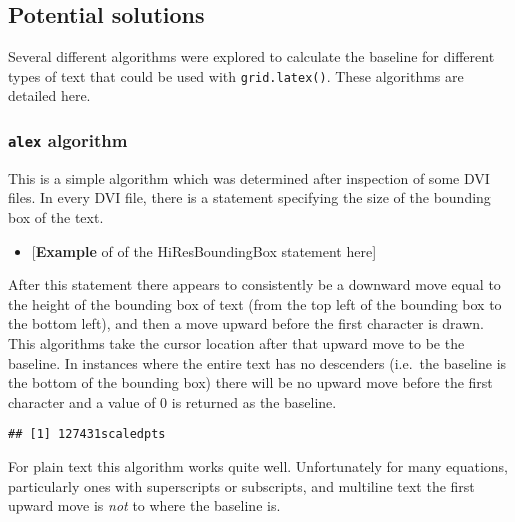 \documentclass[]{article}
\newenvironment{Shaded}{\begin{snugshade}}{\end{snugshade}}
\newcommand{\KeywordTok}[1]{\textcolor[rgb]{0.13,0.29,0.53}{\textbf{#1}}}
\newcommand{\DataTypeTok}[1]{\textcolor[rgb]{0.13,0.29,0.53}{#1}}
\newcommand{\CharTok}[1]{\textcolor[rgb]{0.31,0.60,0.02}{#1}}
\newcommand{\StringTok}[1]{\textcolor[rgb]{0.31,0.60,0.02}{#1}}
\newcommand{\NormalTok}[1]{#1}
\providecommand{\tightlist}{%
  \setlength{\itemsep}{0pt}\setlength{\parskip}{0pt}}
\begin{document}
\subsection{Potential solutions}\label{potential-solutions}

Several different algorithms were explored to calculate the baseline for
different types of text that could be used with \texttt{grid.latex()}.
These algorithms are detailed here.

\subsubsection{\texorpdfstring{\texttt{alex}
algorithm}{alex algorithm}}\label{alex-algorithm}

This is a simple algorithm which was determined after inspection of some
DVI files. In every DVI file, there is a statement specifying the size
of the bounding box of the text.

\begin{itemize}
\tightlist
\item
  {[}\textbf{Example} of of the HiResBoundingBox statement here{]}
\end{itemize}

After this statement there appears to consistently be a downward move
equal to the height of the bounding box of text (from the top left of
the bounding box to the bottom left), and then a move upward before the
first character is drawn. This algorithms take the cursor location after
that upward move to be the baseline. In instances where the entire text
has no descenders (i.e.~the baseline is the bottom of the bounding box)
there will be no upward move before the first character and a value of 0
is returned as the baseline.

\begin{Shaded}
\end{Shaded}

\begin{verbatim}
## [1] 127431scaledpts
\end{verbatim}

For plain text this algorithm works quite well. Unfortunately for many
equations, particularly ones with superscripts or subscripts, and
multiline text the first upward move is \emph{not} to where the baseline
is.
\end{document}
